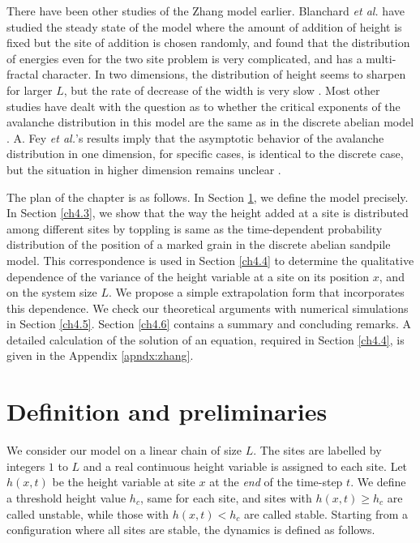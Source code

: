 \documentclass[11pt,a4paper]{book}
\begin{document}
There have been other studies of the Zhang model earlier. 
Blanchard \textit{et al.} \cite{blanchard} have studied the steady state of
the model where the amount of addition of height is fixed but
the site of addition is chosen randomly, and found that the 
distribution of energies even 
for the two site problem is very complicated, and has a multi-fractal 
character. In two dimensions, the distribution of height seems 
to sharpen for larger $L$, but the rate of decrease of the width is very 
slow \cite{janosi}. Most other studies have dealt with the question as to whether the critical exponents of the avalanche distribution in this 
model are the same as in the discrete abelian model \cite{lubeck,milshtein}. A. Fey \textit{et al.}'s results imply that the asymptotic 
behavior of the avalanche distribution in one dimension, for specific
cases, is identical to the discrete case, but the situation in higher dimension remains unclear 
\cite{vespignaniz, guilera}.

The plan of the chapter is as follows. In Section \ref{ch4.2}, we define the model 
precisely.  In Section \ref{ch4.3}, we show that the way the 
height added at a site is distributed among different sites by 
toppling is same as the time-dependent probability 
distribution of the position  of a marked grain in the 
discrete abelian sandpile model. This correspondence is used in Section 
\ref{ch4.4} to determine the qualitative dependence of the variance of the height 
variable at a site on its position $x$, and on the system size $L$. We 
propose a simple extrapolation form that incorporates this dependence. 
We check our theoretical arguments with numerical simulations in
Section \ref{ch4.5}.  
 Section \ref{ch4.6} contains a summary and concluding remarks. A detailed calculation
of the solution of an equation, required in Section \ref{ch4.4}, is
given in the Appendix \ref{apndx:zhang}.




\section{Definition and preliminaries}\label{ch4.2}

We consider our model on a linear chain of size $L$. The sites are 
labelled by integers $1$ to $L$ and a real continuous height variable is 
assigned to each site. Let $h(x,t)$ be the height variable at site $x$ 
at the {\it end} of the time-step $t$. We define a threshold 
height value $h_c$, same for each site, and sites with $h(x,t) \ge h_c $ are 
called unstable, while those with $h(x,t) < h_c$ are called stable.  
Starting from a configuration where all sites are stable, the 
dynamics is defined as follows.
\end{document}
